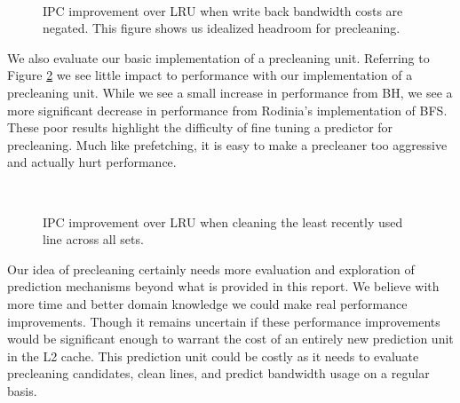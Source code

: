 \begin{figure}[htb]
\begin{center}
\ 
\caption{IPC improvement over LRU when write back bandwidth costs are negated. This figure shows us idealized headroom for precleaning.}
\label{f:preclean_headroom}
\end{center}
\end{figure}

We also evaluate our basic implementation of a precleaning unit. Referring to Figure \ref{f:preclean_perf} we see little impact to performance with our implementation of a precleaning unit. While we see a small increase in performance from BH, we see a more significant decrease in performance from Rodinia's implementation of BFS. These poor results highlight the difficulty of fine tuning a predictor for precleaning. Much like prefetching, it is easy to make a precleaner too aggressive and actually hurt performance.

\begin{figure}[htb]
\begin{center}
\ 
\caption{IPC improvement over LRU when cleaning the least recently used line across all sets.}
\label{f:preclean_perf}
\end{center}
\end{figure}

Our idea of precleaning certainly needs more evaluation and exploration of prediction mechanisms beyond what is provided in this report. We believe with more time and better domain knowledge we could make real performance improvements. Though it remains uncertain if these performance improvements would be significant enough to warrant the cost of an entirely new prediction unit in the L2 cache. This prediction unit could be costly as it needs to evaluate precleaning candidates, clean lines, and predict bandwidth usage on a regular basis.
